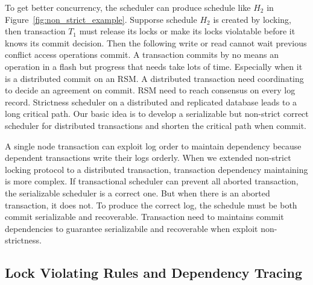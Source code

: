 \documentclass[conference]{IEEEtran}
\begin{document}
To get better concurrency, the scheduler can produce schedule like ${H_2}$ in Figure~\ref{fig:non_strict_example}. 
Supporse schedule ${H_2}$ is created by locking, then transaction ${T_1}$ must release its locks or make its locks violatable before it knows its commit decision.
Then the following write or read cannot wait previous conflict access operations commit.
A transaction commits by no means an operation in a flash but progress that needs take lots of time.
Especially when it is a distributed commit on an RSM.
A distributed transaction need coordinating to decide an agreement on commit.
RSM need to reach consensus on every log record.
Strictness scheduler on a distributed and replicated database leads to a long critical path.
Our basic idea is to develop a serializable but non-strict correct scheduler for distributed transactions and shorten the critical path when commit.

A single node transaction can exploit log order to maintain dependency because dependent transactions write their logs orderly\cite{ELR:dewitt_implementation_1984}\cite{EfficientLocking:conf/vldb/KimuraGK12}.
When we extended non-strict locking protocol to a distributed transaction, transaction dependency maintaining is more complex.
If transactional scheduler can prevent all aborted transaction, the serializable scheduler is a correct one.
But when there is an aborted transaction, it does not.
To produce the correct log, the schedule must be both commit serializable and recoverable\cite{UnifyCR:journals/is/AlonsoVABASW94}.
Transaction need to maintains commit dependencies to guarantee serializabile and recoverable when exploit non-strictness.

\subsection{Lock Violating Rules and Dependency Tracing}
\end{document}
